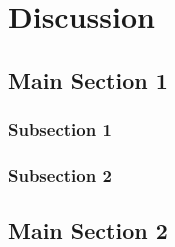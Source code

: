 
\chapter{Discussion}  %

\label{cha:Chapter5} 


\section{Main Section 1}



\subsection{Subsection 1}



\subsection{Subsection 2}


\section{Main Section 2}


